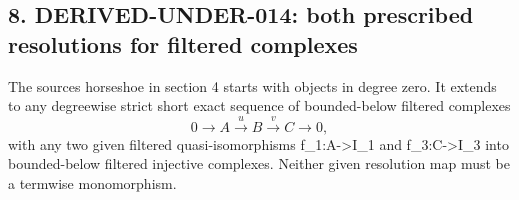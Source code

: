 \subsection{\texorpdfstring{8. DERIVED-UNDER-014:\allowbreak{} both prescribed resolutions for filtered complexes}{8.  both prescribed resolutions for filtered complexes}}\label{proofs-7589-8350-derived-under-014-both-prescribed-resolutions-for-filtered-complexes}

The source\textquotesingle s horseshoe in section 4 starts with objects in degree zero. It extends to any degreewise strict short exact sequence of bounded-below filtered complexes \[
 0\to A\xrightarrow{u}B\xrightarrow{v}C\to0,                 \tag{8.1}
\] with any two given filtered quasi-isomorphisms f\_\allowbreak{}1:\allowbreak{}A\allowbreak{}->I\_\allowbreak{}1 and f\_\allowbreak{}3:\allowbreak{}C\allowbreak{}->I\_\allowbreak{}3 into bounded-below filtered injective complexes. Neither given resolution map must be a termwise monomorphism.

